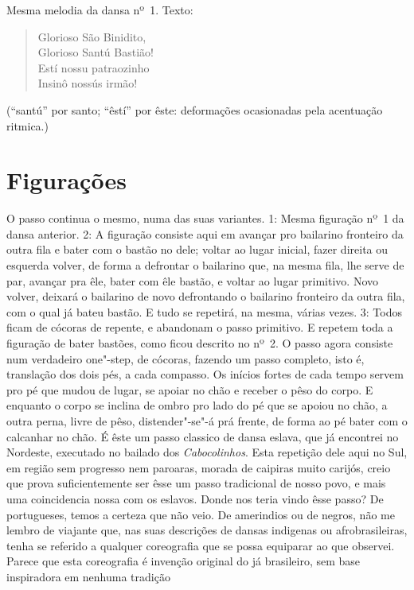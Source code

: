 Mesma melodia da dansa nº~1. Texto:

\begin{verse}
Glorioso São Binidito,\\
Glorioso Santú Bastião!\\
Estí nossu patraozinho\\
Insinô nossús irmão!\\
\end{verse}
(``santú'' por santo; ``êstí'' por êste: deformações ocasionadas pela
acentuação ritmica.)

\section{Figurações}

O passo continua o mesmo, numa das suas variantes. 1: Mesma figuração nº~1 da dansa anterior. 2: A figuração consiste aqui em avançar pro
bailarino fronteiro da outra fila e bater com o bastão no dele; voltar
ao lugar inicial, fazer direita ou esquerda volver, de forma a defrontar
o bailarino que, na mesma fila, lhe serve de par, avançar pra êle, bater
com êle bastão, e voltar ao lugar primitivo. Novo volver, deixará o
bailarino de novo defrontando o bailarino fronteiro da outra fila, com o
qual já bateu bastão. E tudo se repetirá, na mesma, várias vezes. 3:
Todos ficam de cócoras de repente, e abandonam o passo primitivo. E
repetem toda a figuração de bater bastões, como ficou descrito no nº~2.
O passo agora consiste num verdadeiro one"-step, de cócoras, fazendo um
passo completo, isto é, translação dos dois pés, a cada compasso. Os
inícios fortes de cada tempo servem pro pé que mudou de lugar, se apoiar
no chão e receber o pêso do corpo. E enquanto o corpo se inclina de
ombro pro lado do pé que se apoiou no chão, a outra perna, livre de
pêso, distender"-se"-á prá frente, de forma ao pé bater com o calcanhar no
chão. É êste um passo classico de dansa eslava, que já encontrei no
Nordeste, executado no bailado dos \emph{Cabocolinhos}. Esta repetição
dele aqui no Sul, em região sem progresso nem paroaras, morada de
caipiras muito carijós, creio que prova suficientemente ser êsse um
passo tradicional de nosso povo, e mais uma coincidencia nossa com os
eslavos. Donde nos teria vindo êsse passo? De portugueses, temos a
certeza que não veio. De amerindios ou de negros, não me lembro de
viajante que, nas suas descrições de dansas indigenas ou
afrobrasileiras, tenha se referido a qualquer coreografia que se possa
equiparar ao que observei. Parece que esta coreografia é invenção
original do já brasileiro, sem base inspiradora em nenhuma tradição
